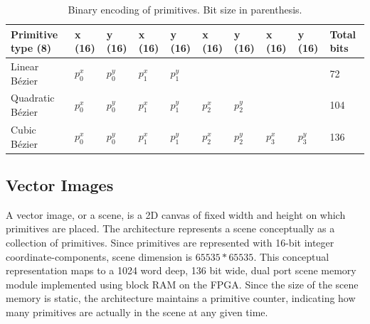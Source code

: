 \begin{table}[h]
    \centering
    \begin{tabularx}{\linewidth}{|l|X|X|X|X|X|X|X|X|X|}
    \hline
    Primitive type (8) & x (16) & y (16) & x (16) & y (16) & x (16) & y (16) & x (16) & y (16) & Total bits \\ \hline
    Linear Bézier    & \(p_0^x \) & \(p_0^y \) & \(p_1^x \) & \(p_1^y \) & ~   & ~   & ~   & ~   & 72    \\ \hline
    Quadratic Bézier & \(p_0^x \) & \(p_0^y \) & \(p_1^x \) & \(p_1^y \) & \(p_2^x \) & \(p_2^y \) & ~   & ~   & 104   \\ \hline
    Cubic Bézier     & \(p_0^x \) & \(p_0^y \) & \(p_1^x \) & \(p_1^y \) & \(p_2^x \) & \(p_2^y \) & \(p_3^x \) & \(p_3^y \) & 136   \\ \hline
  \end{tabularx}
    \caption{Binary encoding of primitives. Bit size in parenthesis.}
	\label{tbl:primitives}
\end{table}

\subsection{Vector Images}

A vector image, or a scene, is a 2D canvas of fixed width and height on which primitives are placed.
The \vthreek architecture represents a scene conceptually as a collection of primitives.
Since primitives are represented with 16-bit integer coordinate-components, scene dimension is $65535 * 65535$.
This conceptual representation maps to a 1024 word deep, 136 bit wide, dual port scene memory module implemented using block RAM \cite{xilinx-block-ram} on the FPGA.
Since the size of the scene memory is static, the architecture maintains a primitive counter, indicating how many primitives are actually in the scene at any given time.
